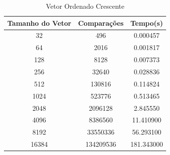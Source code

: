 \documentclass[12pt,a4paper,twoside]{report}
\begin{document}
\begin{table}[h]
  \centering
  \caption{Vetor Ordenado Crescente \label{tab:oc}}
  \begin{tabular}{ccc} \\\hline
  \textbf{Tamanho do Vetor} & \textbf{Comparações} & \textbf{Tempo(s)} \\\hline
  32                        & 496                  & 0.000457          \\\hline
  64                        & 2016                 & 0.001817          \\\hline
  128                       & 8128                 & 0.007373          \\\hline
  256                       & 32640                & 0.028836          \\\hline
  512                       & 130816               & 0.114824          \\\hline
  1024                      & 523776               & 0.513465          \\\hline
  2048                      & 2096128              & 2.845550          \\\hline
  4096                      & 8386560              & 11.410900         \\\hline
  8192                      & 33550336             & 56.293100         \\\hline
  16384                     & 134209536            & 181.343000       \\\hline
  \end{tabular}
\end{table}
\end{document}
